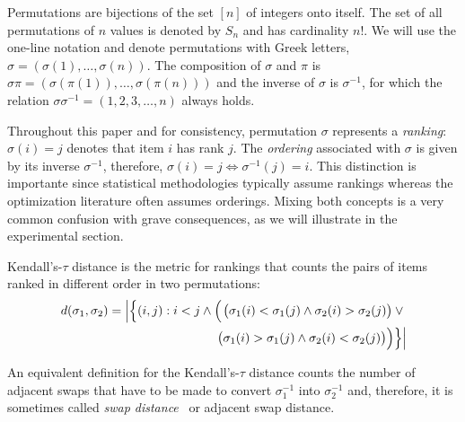 \documentclass[sigconf,dvipsnames]{acmart}
\newcommand{\ken}{Kendall's-$\tau$\xspace}
\begin{document}
Permutations are %
bijections of the set $[n]$ of integers onto itself. The set of all permutations of $n$ values is denoted by $S_n$ and has cardinality $n!$. We will use the one-line notation
and denote permutations with Greek letters, $\sigma  = (\sigma(1), \ldots , \sigma(n))$. The composition of $\sigma$ and $\pi$ is $\sigma\pi = (\sigma(\pi(1)), \ldots, \sigma(\pi(n)))$
and the inverse of $\sigma$ is $\sigma^{-1}$, for which the relation $\sigma\sigma^{-1}=(1, 2, 3, \dotsc,n)$ always holds.

Throughout this paper and for consistency, permutation $\sigma$ represents a \emph{ranking}:  $\sigma(i)=j$ denotes that item $i$ has rank $j$. The \emph{ordering} associated with $\sigma$ is given by its inverse $\sigma^{-1}$, therefore,  $\sigma(i)=j \Leftrightarrow  \sigma^{-1}(j)=i$. This distinction is importante since statistical methodologies typically assume rankings whereas the optimization literature often assumes orderings. Mixing both concepts is a very common confusion with grave consequences, as we will illustrate in the experimental section.

\ken distance is the metric for rankings that counts the pairs of items ranked in different order in two permutations:
%
\begin{equation}\label{eq:kendall_decomp}
\begin{split}
\hspace*{-0.5em}d(\sigma _{1},\sigma_{2})=\left\lvert\Bigl\{(i,j):i<j \land \phantom{}\Bigl(\right.&\bigl(\sigma_{1}(i) < \sigma_{1}(j)\land \sigma_{2}(i)>\sigma_{2}(j)\bigr)\lor \phantom{} \\
 \bigl(&\sigma_{1}(i)>\sigma_{1}(j)\land \sigma_{2}(i)<\sigma_{2}(j)\bigr)\Bigr)\Bigr\}\Bigr\rvert\\
 \end{split}\hspace*{-0.6em}
 \end{equation}

An equivalent definition for the \ken distance counts the number of adjacent swaps that have to be made to convert $\sigma_1^{-1}$ into $\sigma_2^{-1}$ and, therefore, it is sometimes called \emph{swap distance}~\citep{ZaeStoBar2014:ppsn} or adjacent swap distance. %
\end{document}
